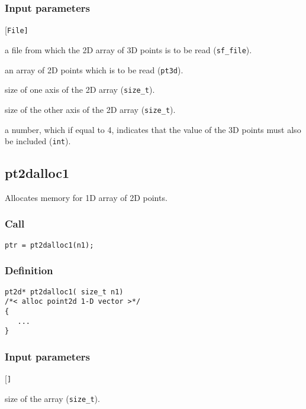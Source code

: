 \subsubsection*{Input parameters}
\begin{desclist}{\tt }{\quad}[\tt File]
   \setlength\itemsep{0pt}
   \item[File] a file from which the 2D array of 3D points is to be read (\texttt{sf\_file}). 
   \item[v]    an array of 2D points which is to be read (\texttt{pt3d}). 
   \item[n1]   size of one axis of the 2D array (\texttt{size\_t}).
   \item[n2]   size of the other axis of the 2D array (\texttt{size\_t}). 
   \item[k]    a number, which if equal to 4, indicates that the value of the 3D points must also be included (\texttt{int}).     
\end{desclist}




\subsection{{pt2dalloc1}}
Allocates memory for 1D array of 2D points.

\subsubsection*{Call}
\begin{verbatim}ptr = pt2dalloc1(n1);\end{verbatim}

\subsubsection*{Definition}
\begin{verbatim}
pt2d* pt2dalloc1( size_t n1)
/*< alloc point2d 1-D vector >*/
{
   ...
}
\end{verbatim}

\subsubsection*{Input parameters}
\begin{desclist}{\tt }{\quad}[\tt ]
   \setlength\itemsep{0pt}
   \item[n1]	size of the array (\texttt{size\_t}).
\end{desclist}

